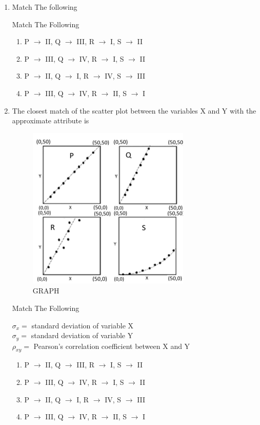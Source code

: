 \documentclass[journal,12pt,onecolumn]{IEEEtran}
\theoremstyle{remark}
\begin{document}
\begin{enumerate}
\hfill{}
\item Match The following 
\begin{table}[H]
  \centering
  \caption{Match The Following}
  
  \label{tab:table3}
\end{table}
\hfill{}
\begin{multicols}{2}
\begin{enumerate}
\item P $\to$ II,\; Q $\to$ III,\; R $\to$ I,\; S $\to$ II
\item P $\to$ III,\; Q $\to$ IV,\; R $\to$ I,\; S $\to$ II
\item P $\to$ II,\; Q $\to$ I,\; R $\to$ IV,\; S $\to$ III
\item P $\to$ III,\; Q $\to$ IV,\; R $\to$ II,\; S $\to$ I
\end{enumerate}
\end{multicols}

\item The closest match of the scatter plot between the variables X and Y with the approximate attribute is 

\hfill{}
\begin{figure}[H]
  \centering
  \includegraphics[width=0.4\columnwidth]{figs/SG.png}
  \caption{GRAPH}
  \label{fig:SG}
\end{figure}
\begin{table}[H]
  \centering
  \caption{Match The Following}
  
  \label{tab:table4}
\end{table}
\vspace{1em}

$\sigma_x =$ standard deviation of variable X \\
$\sigma_y =$ standard deviation of variable Y \\
$\rho_{xy} =$ Pearson's correlation coefficient between X and Y
\begin{multicols}{2}
\begin{enumerate}
\item P $\to$ II,\; Q $\to$ III,\; R $\to$ I,\; S $\to$ II
\item P $\to$ III,\; Q $\to$ IV,\; R $\to$ I,\; S $\to$ II
\item P $\to$ II,\; Q $\to$ I,\; R $\to$ IV,\; S $\to$ III
\item P $\to$ III,\; Q $\to$ IV,\; R $\to$ II,\; S $\to$ I
\end{enumerate}
\end{multicols}


\end{enumerate}
\end{document}
